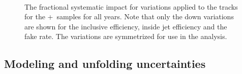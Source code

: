\begin{figure}[h!]
  \centering
   \\
  \caption{The fractional systematic impact for variations applied to the tracks for the \powheg+\pythia~samples for all years. Note that only the down variations are shown for the inclusive efficiency, inside jet efficiency and the fake rate.
  The variations are symmetrized for use in the analysis.}
  \label{fig:PP8TrackSyst}
\end{figure}

\subsection{Modeling and unfolding uncertainties}
